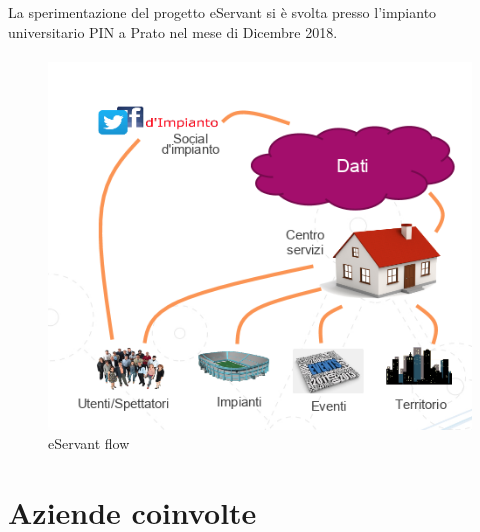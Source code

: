 La sperimentazione del progetto eServant si è svolta presso l’impianto universitario PIN a Prato nel mese di Dicembre 2018.
\paragraph{}

\begin{figure}[h!]
    \centering  
    \caption{eServant flow}
    \includegraphics[scale=0.8]{img/cap1/eservant}
\end{figure}

\paragraph{}

\section{Aziende coinvolte}

